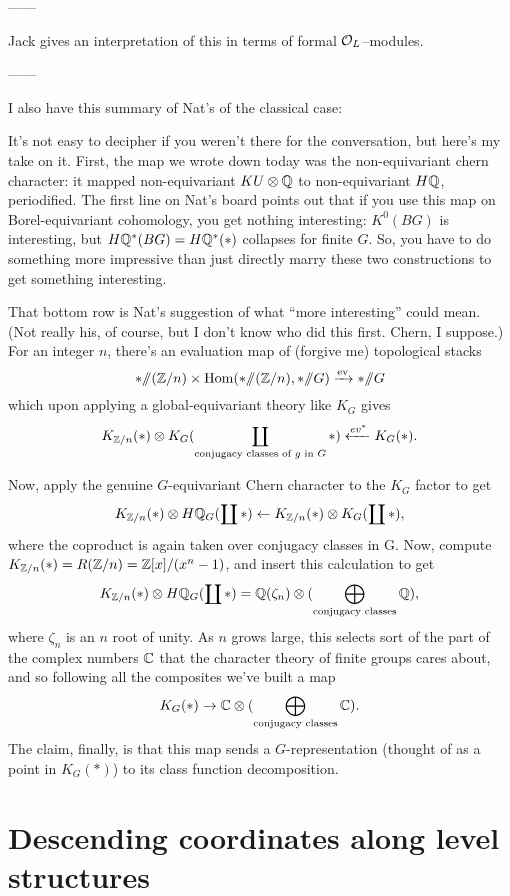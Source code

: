 ------

Jack gives an interpretation of this in terms of formal $\mathcal{O}_L$--modules.

------

I also have this summary of Nat's of the classical case:

It's not easy to decipher if you weren't there for the conversation, but here's my take on it. First, the map we wrote down today was the non-equivariant chern character: it mapped non-equivariant $KU \otimes \mathbb{Q}$ to non-equivariant $H\mathbb{Q}$, periodified. The first line on Nat's board points out that if you use this map on Borel-equivariant cohomology, you get nothing interesting: $K^0(BG)$ is interesting, but $H\mathbb{Q}^*(BG) = H\mathbb{Q}^*(*)$ collapses for finite $G$. So, you have to do something more impressive than just directly marry these two constructions to get something interesting.

That bottom row is Nat's suggestion of what ``more interesting'' could mean. (Not really his, of course, but I don't know who did this first. Chern, I suppose.) For an integer $n$, there's an evaluation map of (forgive me) topological stacks \[* \mmod (\Z/n) \times \operatorname{Hom}(* \mmod (\Z/n), * \mmod G) \xrightarrow{\mathrm{ev}} * \mmod G\] which upon applying a global-equivariant theory like $K_G$ gives \[K_{\mathbb Z/n}(*) \otimes K_G(\coprod_{\text{conjugacy classes of $g$ in $G$}} *) \xleftarrow{ev^*} K_G(*).\]

Now, apply the genuine $G$-equivariant Chern character to the $K_G$ factor to get \[K_{\mathbb Z/n}(*) \otimes H\mathbb{Q}_G(\coprod *) \leftarrow K_{\mathbb Z/n}(*) \otimes K_G(\coprod *),\] where the coproduct is again taken over conjugacy classes in G. Now, compute $K_{\mathbb Z/n}(*) = R(\mathbb Z/n) = \mathbb Z[x] / (x^n - 1)$, and insert this calculation to get \[K_{\mathbb Z/n}(*) \otimes H\mathbb{Q}_G(\coprod *) = \mathbb{Q}(\zeta_n) \otimes (\bigoplus_{\text{conjugacy classes}} \mathbb{Q}),\] where $\zeta_n$ is an $n${\th} root of unity.  As $n$ grows large, this selects sort of the part of the complex numbers $\mathbb{C}$ that the character theory of finite groups cares about, and so following all the composites we've built a map \[K_G(*) \to \mathbb{C} \otimes (\bigoplus_{\text{conjugacy classes}} \mathbb{C}).\]  The claim, finally, is that this map sends a $G$-representation (thought of as a point in $K_G(*)$) to its class function decomposition.







\section{Descending coordinates along level structures}

